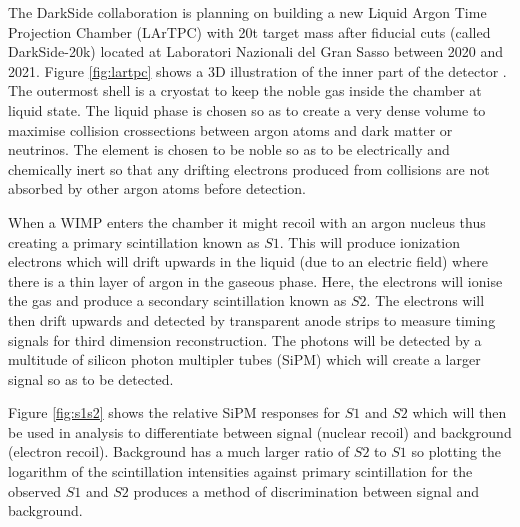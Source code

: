 \documentclass[11pt]{article} %
\begin{document}
The DarkSide collaboration is planning on building a new Liquid Argon Time Projection Chamber (LArTPC) with 20t target mass after fiducial cuts \cite{Aalseth_2018} (called DarkSide-20k) located at Laboratori Nazionali del
Gran Sasso between 2020 and 2021. Figure \ref{fig:lartpc} shows a 3D illustration of the inner part of the detector . The outermost shell is a cryostat to keep the noble gas inside the chamber at liquid state. The liquid phase is chosen so as to create a very dense volume to maximise collision crossections between argon atoms and dark matter or neutrinos. The element is chosen to be noble so as to be electrically and chemically inert so that any drifting electrons produced from collisions are not absorbed by other argon atoms before detection.
\newline

When a WIMP enters the chamber it might recoil with an argon nucleus thus creating a primary scintillation known as \textbf{$S1$}. This will produce ionization electrons which will drift upwards in the liquid (due to an electric field) where there is a thin layer of argon in the gaseous phase. Here, the electrons will ionise the gas and produce a secondary scintillation known as \textbf{$S2$}. The electrons will then drift upwards and detected by transparent anode strips to measure timing signals for third dimension reconstruction. The photons will be detected by a multitude of silicon photon multipler tubes (SiPM) which will create a larger signal so as to be detected.
\newline

Figure \ref{fig:s1s2} shows the relative SiPM responses for $S1$ and $S2$ which will then be used in analysis to differentiate between signal (nuclear recoil) and background (electron recoil). Background has a much larger ratio of $S2$ to $S1$ so plotting the logarithm of the scintillation intensities against primary scintillation for the observed $S1$ and $S2$ produces a method of discrimination between signal and background.
\end{document}
